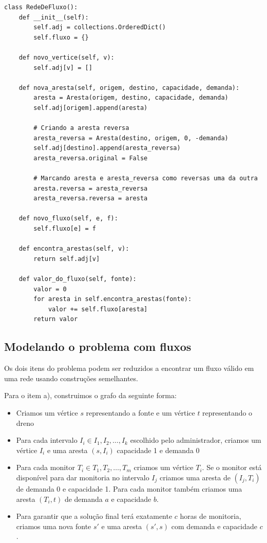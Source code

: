 \documentclass[11pt]{article}
\begin{document}
\begin{verbatim}
class RedeDeFluxo():
    def __init__(self):
        self.adj = collections.OrderedDict()
        self.fluxo = {}

    def novo_vertice(self, v):
        self.adj[v] = []

    def nova_aresta(self, origem, destino, capacidade, demanda):
        aresta = Aresta(origem, destino, capacidade, demanda)
        self.adj[origem].append(aresta)

        # Criando a aresta reversa
        aresta_reversa = Aresta(destino, origem, 0, -demanda)
        self.adj[destino].append(aresta_reversa)
        aresta_reversa.original = False

        # Marcando aresta e aresta_reversa como reversas uma da outra
        aresta.reversa = aresta_reversa
        aresta_reversa.reversa = aresta

    def novo_fluxo(self, e, f):
        self.fluxo[e] = f

    def encontra_arestas(self, v):
        return self.adj[v]

    def valor_do_fluxo(self, fonte):
        valor = 0
        for aresta in self.encontra_arestas(fonte):
            valor += self.fluxo[aresta]
        return valor
\end{verbatim}

\subsection{Modelando o problema com fluxos}
\label{sec-1-3}

Os dois itens do problema podem ser reduzidos a encontrar um fluxo
válido em uma rede usando construções semelhantes.

Para o item a), construimos o grafo da seguinte forma:

\begin{itemize}
\item Criamos um vértice $s$ representando a fonte e um vértice $t$
  representando o dreno
\item Para cada intervalo $I_i \in I_1, I_2, \ldots, I_k$ escolhido pelo
administrador, criamos um vértice $I_i$ e uma aresta $(s, I_i)$
capacidade 1 e demanda 0
\item Para cada monitor $T_i \in T_1, T_2, \ldots, T_m$ criamos um vértice
$T_i$. Se o monitor está disponível para dar monitoria no intervalo
$I_j$ criamos uma aresta de $(I_j, T_i)$ de demanda 0 e
capacidade 1. Para cada monitor também criamos uma aresta
$(T_i, t)$ de demanda $a$ e capacidade $b$.
\item Para garantir que a solução final terá exatamente $c$ horas de
monitoria, criamos uma nova fonte $s'$ e uma aresta $(s', s)$
com demanda e capacidade $c$.
\end{itemize}
\end{document}
